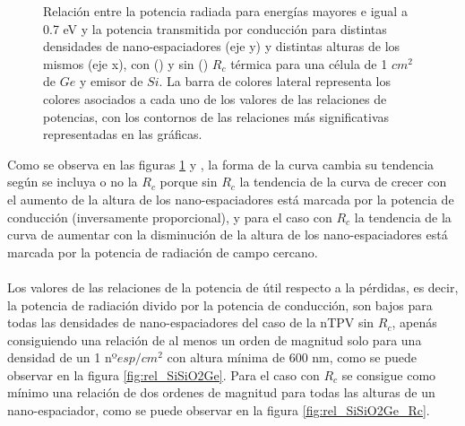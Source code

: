\begin{figure}[H]
	\caption[Relación entre la potencia radiada para energías mayores e igual a 0.7 eV y la potencia transmitida por conducción para distintas densidades de nano-espaciadores (eje y) y distintas alturas de los mismos (eje x), con () y sin () $R_c$ térmica para una célula de 1 $cm^2$ de $Ge$ y emisor de $Si$. La barra de colores lateral representa los colores asociados a cada uno de los valores de las relaciones de potencias, con los contornos de las relaciones más significativas representadas en las gráficas.]{\small Relación entre la potencia radiada para energías mayores e igual a 0.7 eV y la potencia transmitida por conducción para distintas densidades de nano-espaciadores (eje y) y distintas alturas de los mismos (eje x), con () y sin () $R_c$ térmica para una célula de 1 $cm^2$ de $Ge$ y emisor de $Si$. La barra de colores lateral representa los colores asociados a cada uno de los valores de las relaciones de potencias, con los contornos de las relaciones más significativas representadas en las gráficas.
	}
	\label{fig:relation_SiSiO2Ge}
\end{figure}
Como se observa en las figuras \ref{fig:relation_SiSiO2Ge}  y , la forma de la curva cambia su tendencia según se incluya o no la $R_c$ porque sin $R_c$ la tendencia de la curva de crecer con el aumento de la altura de los nano-espaciadores está marcada por la potencia de conducción (inversamente proporcional), y para el caso con $R_c$ la  tendencia de la curva de aumentar con la disminución de la altura de los nano-espaciadores está marcada por la potencia de radiación de campo cercano.\\\\
Los valores de las relaciones de la potencia de útil respecto a la pérdidas, es decir, la potencia de radiación divido por la potencia de conducción, son bajos para todas las densidades de nano-espaciadores del caso de la nTPV sin $R_c$, apenás consiguiendo una relación de al menos un orden de magnitud solo para una densidad de un 1 nº$esp/cm^2$ con altura mínima de 600 nm, como se puede observar en la figura \ref{fig:rel_SiSiO2Ge}. Para el caso con $R_c$ se consigue como mínimo una relación de dos ordenes de magnitud para todas las alturas de un nano-espaciador, como se puede observar en la figura \ref{fig:rel_SiSiO2Ge_Rc}.\\\\
